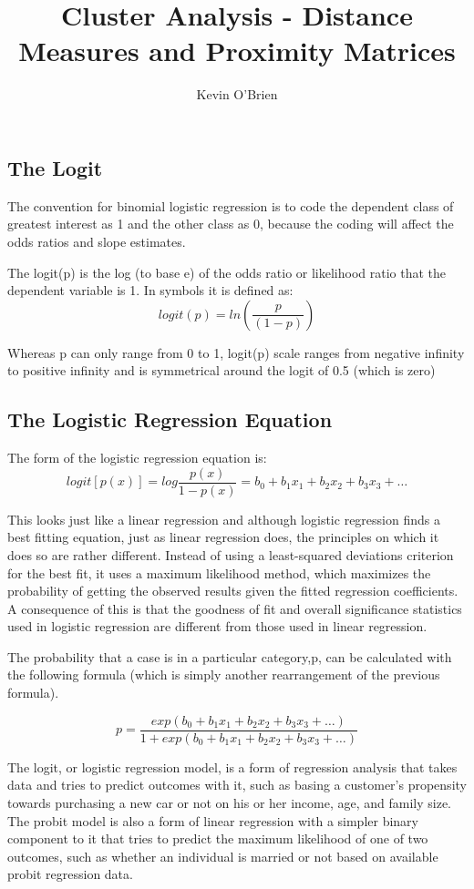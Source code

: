 \documentclass[]{report}
\begin{document}
\author{Kevin O'Brien}
\title{Cluster Analysis - Distance Measures and Proximity Matrices}
\tableofcontents
\subsection{The Logit}
The convention for binomial logistic regression is to code the
dependent class of greatest interest as 1 and the other class as 0, because the coding will
affect the odds ratios and slope estimates.

The logit(p) is the log (to base e) of the odds ratio or likelihood ratio that the dependent
variable is 1. In symbols it is defined as:
\[ logit(p) = ln \left(\frac{p}{(1-p)}\right) \]

Whereas p can only range from 0 to 1, logit(p) scale ranges from negative infinity to positive
infinity and is symmetrical around the logit of 0.5 (which is zero)

\subsection{The Logistic Regression Equation}
The form of the logistic regression equation is:
\[ logit[p(x)] =  log \frac{p(x)}{1-p(x)}  = b_0 + b_1x_1 + b_2x_2 + b_3x_3 + \ldots \]

This looks just like a linear regression and although logistic regression finds a best
fitting equation, just as linear regression does, the principles on which it does so are
rather different. Instead of using a least-squared deviations criterion for the best fit, it
uses a maximum likelihood method, which maximizes the probability of getting the
observed results given the fitted regression coefficients. A consequence of this is that the
goodness of fit and overall significance statistics used in logistic regression are different
from those used in linear regression.

The probability that a case is in a particular category,p, can be calculated with the following formula (which is simply another rearrangement of the previous formula).

\[p = \frac{exp(b_0 + b_1x_1 + b_2x_2 + b_3x_3 + \ldots)}{1 + exp(b_0 + b_1x_1 + b_2x_2 + b_3x_3 + \ldots)}\]


The logit, or logistic regression model, is a form of regression analysis that takes data and tries to predict outcomes with it, such as basing a customer's propensity towards purchasing a new car or not on his or her income, age, and family size. The probit model is also a form of linear regression with a simpler binary component to it that tries to predict the maximum likelihood of one of two outcomes, such as whether an individual is married or not based on available probit regression data.
\end{document}
